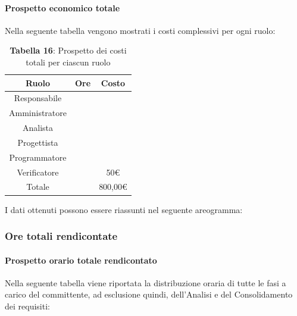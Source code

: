 \paragraph{Prospetto economico totale}
Nella seguente tabella vengono mostrati i costi complessivi per ogni ruolo:

\begin{table}[H]
	\centering
	\renewcommand{\arraystretch}{1.5}
	\begin{tabular}{|c|c|c|}
		\hline
		\rowcolor{lighter-grayer}
		Ruolo & Ore & Costo \\
		\hline
		Responsabile &  &  \\
		\hline
		Amministratore &  &  \\
		\hline
		Analista &  &  \\
		\hline
		Progettista&  &  \\
		\hline
		Programmatore &  &  \\
		\hline
		Verificatore &  & 50\euro \\
		\hline
		Totale &  &  800,00\euro \\
		\hline
	\end{tabular}
	\caption*{\textbf{Tabella 16}: Prospetto dei costi totali per ciascun ruolo \\}
\end{table}

I dati ottenuti possono essere riassunti nel seguente areogramma:


\begin{figure}[!h]
	\centering
\end{figure}

\subsubsection{Ore totali rendicontate}
\paragraph{Prospetto orario totale rendicontato}
Nella seguente tabella viene riportata la distribuzione oraria di tutte le fasi a carico del committente, ad esclusione quindi, dell'Analisi e del Consolidamento dei requisiti:

